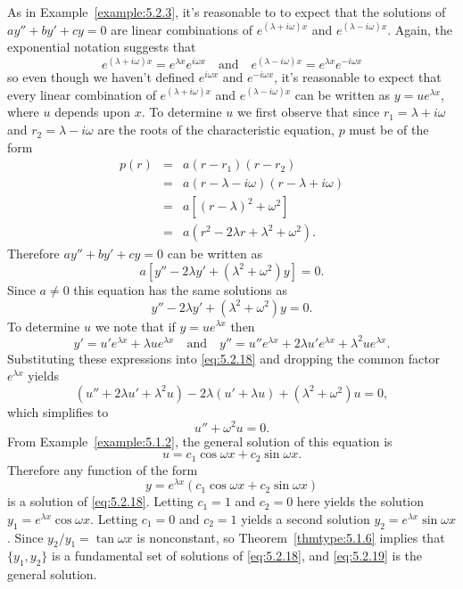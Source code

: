 \documentclass{ximera}
\begin{document}
As in Example~\ref{example:5.2.3}, it's reasonable to
to expect that the solutions of $ay''+by'+cy=0$  are linear
combinations of
$e^{(\lambda+i\omega)x}$ and $e^{(\lambda-i\omega)x}$.
Again,  the exponential notation suggests that
$$
e^{(\lambda+i\omega)x}=e^{\lambda x}e^{i\omega x}\quad\mbox{and}\quad e^{(\lambda-i\omega)x}=e^{\lambda x}e^{-i\omega x}
$$
so even though we haven't defined $e^{i\omega x}$ and
$e^{-i\omega x}$, it's reasonable to expect that every linear
combination of $e^{(\lambda+i\omega)x}$ and $e^{(\lambda-i\omega)x}$
can  be written as
$y=ue^{\lambda x}$, where $u$ depends upon $x$.
To determine $u$ we first observe that since $r_1=\lambda+i\omega$
and $r_2=\lambda-i\omega$ are the roots of the characteristic
equation,  $p$ must be of  the form
$$
\begin{array}{ccl}
p(r)&=&a(r-r_1)(r-r_2)\\
&=&a(r-\lambda-i\omega)(r-\lambda+i\omega)\\
&=& a \left[(r-\lambda)^2+\omega^2\right]\\
&=&a(r^2-2\lambda r +\lambda^2+\omega^2).
\end{array}
$$
Therefore $ay''+by'+cy=0$ can be written as
$$
a\left[y''-2\lambda y'+(\lambda^2+\omega^2)y\right]=0.
$$
 Since $a\neq 0$
this equation has the same solutions as
\begin{equation} \label{eq:5.2.18}
y''-2\lambda y'+(\lambda^2+\omega^2)y=0.
\end{equation}
 To determine $u$ we note
that if $y=ue^{\lambda x}$ then
$$
y'=u'e^{\lambda x}+\lambda ue^{\lambda x}\quad\mbox{and}\quad
y''=u''e^{\lambda x}+2\lambda u'e^{\lambda x}+\lambda^2ue^{\lambda x}.
$$
Substituting these expressions  into
\eqref{eq:5.2.18} and dropping the common factor $e^{\lambda x}$ yields
$$
(u''+2\lambda u'+\lambda^2 u)-2\lambda(u'+\lambda u)
+(\lambda^2+\omega^2)u=0,
$$
which simplifies to
$$
u''+\omega^2 u=0.
$$
From Example~\ref{example:5.1.2}, the  general solution of this
equation is
$$
u=c_1\cos\omega x +c_2\sin\omega x.
$$
 Therefore any function of the form
\begin{equation} \label{eq:5.2.19}
y=e^{\lambda x}(c_1\cos\omega x+c_2\sin\omega x)
\end{equation}
is  a solution of \eqref{eq:5.2.18}.
Letting $c_1=1$ and $c_2=0$ here yields the solution
 $y_1=e^{\lambda x}\cos\omega x$. Letting $c_1=0$ and $c_2=1$
yields a second solution $y_2=e^{\lambda x}\sin\omega x$. Since
$y_2/y_1=\tan\omega x$
is nonconstant, so  Theorem~\ref{thmtype:5.1.6} implies that
$\{y_1,y_2\}$ is
a fundamental set of solutions of \eqref{eq:5.2.18}, and \eqref{eq:5.2.19}
is the general solution.
 
\end{document}
